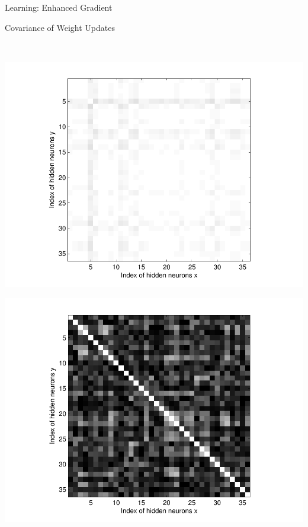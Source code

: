 \documentclass{beamer}
\begin{document}
\begin{frame}{Learning: Enhanced Gradient}
\begin{minipage}{0.35\textwidth}
        \begin{minipage}{\columnwidth}
            \scriptsize
            \begin{center}
                Covariance of Weight Updates
            \end{center}
        \end{minipage}
        \\
        \begin{minipage}{0.49\columnwidth}
            \begin{minipage}{\columnwidth}
                \begin{center}
                    \includegraphics[width=\columnwidth,trim=93 35 75 20,clip=true]{norm_grad_cov.pdf}
                \end{center}
            \end{minipage}
            \begin{minipage}{\columnwidth}
                \begin{center}
                    \includegraphics[width=\columnwidth,trim=93 35 75 20,clip=true]{enh_grad_cov.pdf}

\end{center}
\end{minipage}
\end{minipage}
\end{minipage}
\end{frame}
\end{document}
